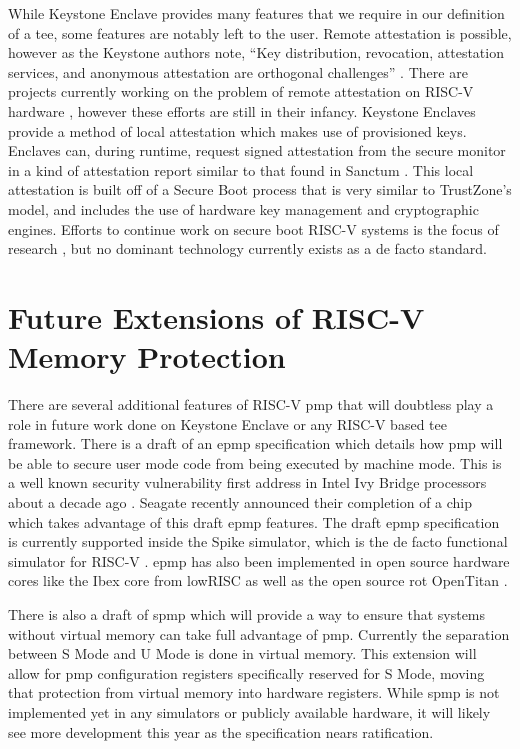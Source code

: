 While Keystone Enclave provides many features that we require in our definition of a \gls{tee}, some features are notably left to the user. Remote attestation is possible, however as the Keystone authors note, ``Key distribution, revocation, attestation services, and anonymous attestation are orthogonal challenges'' \cite{lee2019keystone}. There are projects currently working on the problem of remote attestation on RISC-V hardware \cite{shepherd2021lira}, however these efforts are still in their infancy. Keystone Enclaves provide a method of local attestation which makes use of provisioned keys. Enclaves can, during runtime, request signed attestation from the secure monitor in a kind of attestation report similar to that found in Sanctum \cite{lebedev2018secure}. This local attestation is built off of a Secure Boot process that is very similar to TrustZone's model, and includes the use of hardware key management and cryptographic engines. Efforts to continue work on secure boot RISC-V systems is the focus of research \cite{haj2019lightweight}, but no dominant technology currently exists as a de facto standard.

\section{Future Extensions of RISC-V Memory Protection}

There are several additional features of RISC-V \gls{pmp} that will doubtless play a role in future work done on Keystone Enclave or any RISC-V based \gls{tee} framework. There is a draft of an \gls{epmp} specification which details how \gls{pmp} will be able to secure user mode code from being executed by machine mode. This is a well known security vulnerability first address in Intel Ivy Bridge processors about a decade ago \cite{6922075}. Seagate recently announced their completion of a chip which takes advantage of this draft \gls{epmp} features. The draft \gls{epmp} specification is currently supported inside the Spike simulator, which is the de facto functional simulator for RISC-V \cite{asanovic2016rocket}. \gls{epmp} has also been implemented in open source hardware cores like the Ibex core from lowRISC \cite{urlIbex} as well as the open source \gls{rot} OpenTitan \cite{guilley2021implementing}.

There is also a draft of \gls{spmp} which will provide a way to ensure that systems without virtual memory can take full advantage of \gls{pmp}. Currently the separation between S Mode and U Mode is done in virtual memory. This extension will allow for \gls{pmp} configuration registers specifically reserved for S Mode, moving that protection from virtual memory into hardware registers. While \gls{spmp} is not implemented yet in any simulators or publicly available hardware, it will likely see more development this year as the specification nears ratification.

